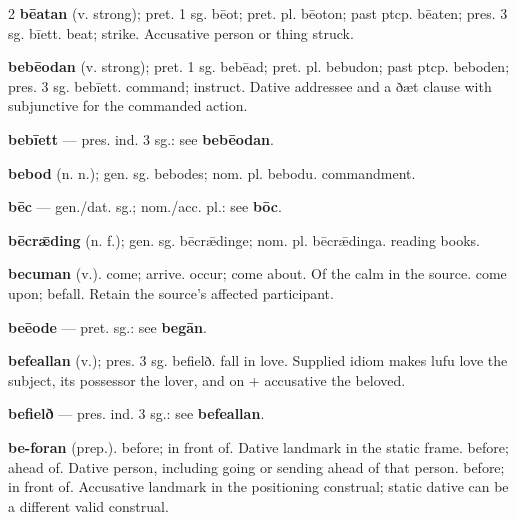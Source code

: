 \begin{multicols*}{2}
\textbf{bēatan} (v. strong); pret. 1 sg. bēot; pret. pl. bēoton; past ptcp. bēaten; pres. 3 sg. bīett. beat; strike. Accusative person or thing struck.\par
\textbf{bebēodan} (v. strong); pret. 1 sg. bebēad; pret. pl. bebudon; past ptcp. beboden; pres. 3 sg. bebīett. command; instruct. Dative addressee and a ðæt clause with subjunctive for the commanded action.\par
\textbf{bebīett} — pres. ind. 3 sg.: see \textbf{bebēodan}.\par
\textbf{bebod} (n. n.); gen. sg. bebodes; nom. pl. bebodu. commandment.\par
\textbf{bēc} — gen./dat. sg.; nom./acc. pl.: see \textbf{bōc}.\par
\textbf{bēcrǣding} (n. f.); gen. sg. bēcrǣdinge; nom. pl. bēcrǣdinga. reading books.\par
\textbf{becuman} (v.). come; arrive. occur; come about. Of the calm in the source. come upon; befall. Retain the source's affected participant.\par
\textbf{beēode} — pret. sg.: see \textbf{begān}.\par
\textbf{befeallan} (v.); pres. 3 sg. befielð. fall in love. Supplied idiom makes lufu love the subject, its possessor the lover, and on + accusative the beloved.\par
\textbf{befielð} — pres. ind. 3 sg.: see \textbf{befeallan}.\par
\textbf{be-foran} (prep.). before; in front of. Dative landmark in the static frame. before; ahead of. Dative person, including going or sending ahead of that person. before; in front of. Accusative landmark in the positioning construal; static dative can be a different valid construal.\par

\end{multicols*}

